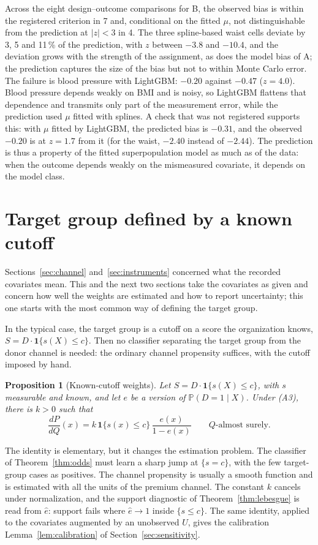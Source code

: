 \documentclass[twoside,11pt]{article}
\newcommand{\PP}{\mathbb{P}}
\newcommand{\ind}{\mathbf{1}}
\theoremstyle{plain}
\newtheorem{proposition}{Proposition}
\theoremstyle{definition}
\begin{document}
Across the eight design--outcome comparisons for B, the observed bias is within the registered criterion in 7 and, conditional on the fitted $\mu$, not distinguishable from the prediction at $|z|<3$ in 4. The three spline-based waist cells deviate by 3, 5 and 11\,\% of the prediction, with $z$ between $-3.8$ and $-10.4$, and the deviation grows with the strength of the assignment, as does the model bias of A; the prediction captures the size of the bias but not to within Monte Carlo error. The failure is blood pressure with LightGBM: $-0.20$ against $-0.47$ ($z=4.0$). Blood pressure depends weakly on BMI and is noisy, so LightGBM flattens that dependence and transmits only part of the measurement error, while the prediction used $\mu$ fitted with splines. A check that was not registered supports this: with $\mu$ fitted by LightGBM, the predicted bias is $-0.31$, and the observed $-0.20$ is at $z=1.7$ from it (for the waist, $-2.40$ instead of $-2.44$). The prediction is thus a property of the fitted superpopulation model as much as of the data: when the outcome depends weakly on the mismeasured covariate, it depends on the model class.
\section{Target group defined by a known cutoff}\label{sec:cutoff}

Sections~\ref{sec:channel} and~\ref{sec:instruments} concerned what the recorded covariates mean. This and the next two sections take the covariates as given and concern how well the weights are estimated and how to report uncertainty; this one starts with the most common way of defining the target group.

In the typical case, the target group is a cutoff on a score the organization knows, $S=D\cdot\ind\{s(X)\le c\}$. Then no classifier separating the target group from the donor channel is needed: the ordinary channel propensity suffices, with the cutoff imposed by hand.

\begin{proposition}[Known-cutoff weights]\label{prop:cutoff}
Let $S=D\cdot\ind\{s(X)\le c\}$, with $s$ measurable and known, and let $e$ be a version of $\PP(D=1\mid X)$. Under (A3), there is $k>0$ such that
\[
\frac{dP}{dQ}(x)=k\,\ind\{s(x)\le c\}\,\frac{e(x)}{1-e(x)}\qquad Q\text{-almost surely.}
\]
\end{proposition}

The identity is elementary, but it changes the estimation problem. The classifier of Theorem~\ref{thm:odds} must learn a sharp jump at $\{s=c\}$, with the few target-group cases as positives. The channel propensity is usually a smooth function and is estimated with all the units of the premium channel. The constant $k$ cancels under normalization, and the support diagnostic of Theorem~\ref{thm:lebesgue} is read from $\hat e$: support fails where $\hat e\to1$ inside $\{s\le c\}$. The same identity, applied to the covariates augmented by an unobserved $U$, gives the calibration Lemma~\ref{lem:calibration} of Section~\ref{sec:sensitivity}.
\end{document}
